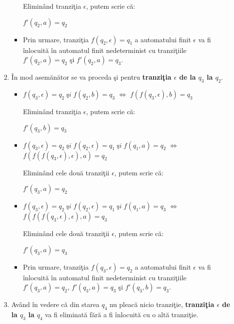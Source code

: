 \begin{enumerate}
\begin{enumerate}
\begin{itemize}
Eliminând tranziţia $ \epsilon $, putem scrie că:

$ f'(q_2, a) = q_2 $
\item
Prin urmare, tranziţia $ f(q_2, \epsilon) = q_1 $ a automatului finit $ \epsilon $ va fi înlocuită în automatul finit nedeterminist cu tranziţiile $ f'(q_2, a) = q_2 $ şi $ f'(q_2, a) = q_3 $.
\end{itemize}

\item
În mod asemănător se va proceda şi pentru \textbf{tranziţia $ \epsilon $ de la $ q_3 $ la $ q_2 $}.

\begin{itemize}
\item
$ f(q_3, \epsilon) = q_2  \; şi \; f(q_2, b) = q_3 $ $ \Leftrightarrow $ $ f(f(q_3, \epsilon),b) = q_3 $ 

Eliminând tranziţia $ \epsilon $, putem scrie că:

$ f'(q_3, b) = q_3 $
\item
$ f(q_3, \epsilon) = q_2  \; şi \; f(q_2, \epsilon) = q_1 \; şi \; f(q_1, a) = q_2$ $ \Leftrightarrow $ $ f(f(f(q_3, \epsilon), \epsilon),a) = q_2 $ 

Eliminând cele două tranziţii $ \epsilon $, putem scrie că:

$ f'(q_3, a) = q_2 $
\item
$ f(q_3, \epsilon) = q_2  \; şi \; f(q_2, \epsilon) = q_1 \; şi \; f(q_1, a) = q_3$ $ \Leftrightarrow $ $ f(f(f(q_3, \epsilon), \epsilon),a) = q_3 $ 

Eliminând cele două tranziţii $ \epsilon $, putem scrie că:

$ f'(q_3, a) = q_3 $
\item
Prin urmare, tranziţia $ f(q_3, \epsilon) = q_2 $ a automatului finit $ \epsilon $ va fi înlocuită în automatul finit nedeterminist cu tranziţiile $ f'(q_3, a) = q_2 $, $ f'(q_3, a) = q_3 $  şi $ f'(q_3, b) = q_3 $.
\end{itemize}
\item
Având în vedere că din starea $ q_4 $ nu pleacă nicio tranziţie, \textbf{tranziţia $ \epsilon $ de la $ q_3 $ la $ q_4 $} va fi eliminată fără a fi înlocuită cu o altă tranziţie.
\end{enumerate}

\begin{figure}[H]
\centering
{}
\end{figure}
\end{enumerate}
